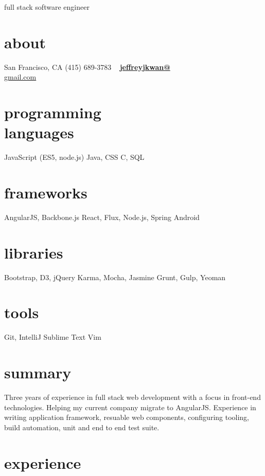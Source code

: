 \documentclass[]{friggeri-cv}
\begin{document}
       {full stack software engineer}


\begin{aside}
  \section{about}
    San Francisco, CA
    (415) 689-3783
    ~
    \href{mailto:jeffreyjkwan@gmail.com}{\textbf{jeffreyjkwan@}\\gmail.com}
  \section{programming\\languages}
    JavaScript
    (ES5, node.js)
    Java, CSS
    C, SQL
  \section{frameworks}
    AngularJS, Backbone.js
    React, Flux,
    Node.js, Spring
    Android
  \section{libraries}
    Bootstrap, D3, jQuery
    Karma, Mocha, Jasmine
    Grunt, Gulp, Yeoman
  \section{tools}
    Git, IntelliJ
    Sublime Text
    Vim
\end{aside}

\section{summary}

Three years of experience in full stack web development with a focus in front-end technologies. Helping my current company migrate to AngularJS. Experience in writing application framework, resuable web components, configuring tooling, build automation, unit and end to end test suite.

\section{experience}
\end{document}
